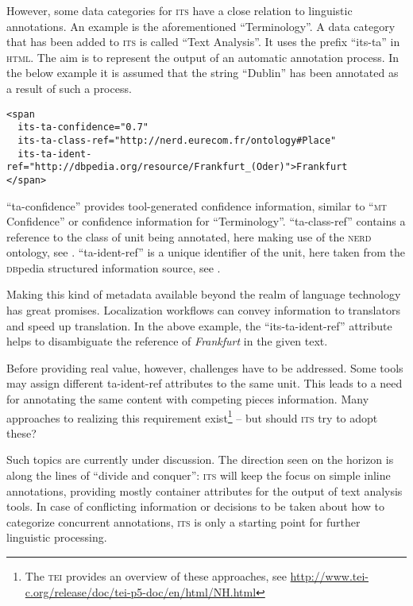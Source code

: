 \documentclass[output=paper]{LSP/langsci}
\begin{document}
However, some data categories for \textsc{its } have a close relation to linguistic annotations. An example is the aforementioned ``Terminology''. A data category that has been added to \textsc{its } is called ``Text Analysis''. It uses the prefix ``its-ta'' in \textsc{html}. The aim is to represent the output of an automatic annotation process. In the below example it is assumed that the string ``Dublin'' has been annotated as a result of such a process.


\begin{lstlisting}
<span
  its-ta-confidence="0.7"
  its-ta-class-ref="http://nerd.eurecom.fr/ontology#Place"
  its-ta-ident-ref="http://dbpedia.org/resource/Frankfurt_(Oder)">Frankfurt
</span>
\end{lstlisting}

``ta-confidence'' provides tool-generated confidence information, similar to ``\textsc{mt} Confidence'' or confidence information for ``Terminology''. ``ta-class-ref'' contains a reference to the class of unit being annotated, here making use of the \textsc{nerd} ontology, see \citet{RizzoEtAl2012}. ``ta-ident-ref'' is a unique identifier of the unit, here taken from the \textsc{db}pedia  structured information source, see \citet{KobilarovEtAl2007}.

Making this kind of metadata available beyond the realm of language technology has great promises. Localization workflows can convey information to translators and speed up translation. In the above example, the ``its-ta-ident-ref'' attribute helps to disambiguate the reference of \textit{Frankfurt} in the given text. 

Before providing real value, however, challenges have to be addressed. Some tools may assign different ta-ident-ref attributes to the same unit. This leads to a need for annotating the same content with competing pieces information. Many approaches to realizing this requirement exist\footnote{The \textsc{tei} provides an overview of these approaches, see \url{http://www.tei-c.org/release/doc/tei-p5-doc/en/html/NH.html}} -- but should \textsc{its } try to adopt these?

Such topics are currently under discussion. The direction seen on the horizon is along the lines of ``divide and conquer'': \textsc{its } will keep the focus on simple inline annotations, providing mostly container attributes for the output of text analysis tools. In case of conflicting information or decisions to be taken about how to categorize concurrent annotations, \textsc{its } is only a starting point for further linguistic processing.
\end{document}
